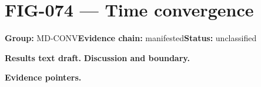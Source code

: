 \clearpage
\section{FIG-074 --- Time convergence}
\label{figpage:fig-074}
\textbf{Group:} MD-CONV\quad \textbf{Evidence chain:} manifested\quad \textbf{Status:} unclassified

\textbf{Results text draft.} 
\textbf{Discussion and boundary.} 


\textbf{Evidence pointers.}



\vfill
